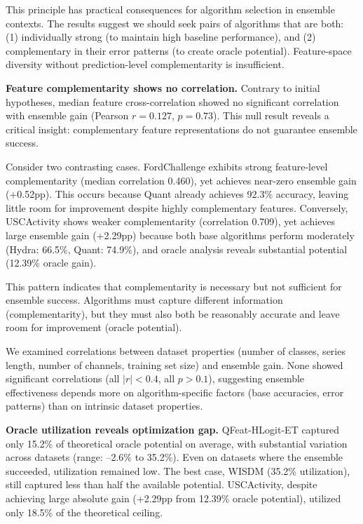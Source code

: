 \documentclass[pdflatex,sn-basic]{sn-jnl}           %
\theoremstyle{thmstyleone}%
\theoremstyle{thmstyletwo}%
\theoremstyle{thmstylethree}%
\begin{document}
This principle has practical consequences for algorithm selection in ensemble contexts. The results suggest we should seek pairs of algorithms that are both: (1) individually strong (to maintain high baseline performance), and (2) complementary in their error patterns (to create oracle potential). Feature-space diversity without prediction-level complementarity is insufficient.

\textbf{Feature complementarity shows no correlation.} Contrary to initial hypotheses, median feature cross-correlation showed no significant correlation with ensemble gain (Pearson $r=0.127$, $p=0.73$). This null result reveals a critical insight: complementary feature representations do not guarantee ensemble success.

Consider two contrasting cases. FordChallenge exhibits strong feature-level complementarity (median correlation 0.460), yet achieves near-zero ensemble gain (+0.52pp). This occurs because Quant already achieves 92.3\% accuracy, leaving little room for improvement despite highly complementary features. Conversely, USCActivity shows weaker complementarity (correlation 0.709), yet achieves large ensemble gain (+2.29pp) because both base algorithms perform moderately (Hydra: 66.5\%, Quant: 74.9\%), and oracle analysis reveals substantial potential (12.39\% oracle gain).

This pattern indicates that complementarity is necessary but not sufficient for ensemble success. Algorithms must capture different information (complementarity), but they must also both be reasonably accurate and leave room for improvement (oracle potential).

We examined correlations between dataset properties (number of classes, series length, number of channels, training set size) and ensemble gain. None showed significant correlations (all $|r| < 0.4$, all $p > 0.1$), suggesting ensemble effectiveness depends more on algorithm-specific factors (base accuracies, error patterns) than on intrinsic dataset properties.

\textbf{Oracle utilization reveals optimization gap.} QFeat-HLogit-ET captured only 15.2\% of theoretical oracle potential on average, with substantial variation across datasets (range: --2.6\% to 35.2\%). Even on datasets where the ensemble succeeded, utilization remained low. The best case, WISDM (35.2\% utilization), still captured less than half the available potential. USCActivity, despite achieving large absolute gain (+2.29pp from 12.39\% oracle potential), utilized only 18.5\% of the theoretical ceiling.
\end{document}
